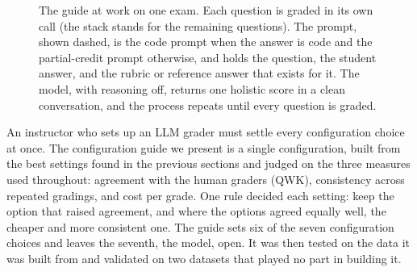 \begin{figure}[!tb]
{%
}
\caption{The guide at work on one exam. Each question is graded in its own call (the stack stands for the
remaining questions). The prompt, shown dashed, is the code prompt when the answer is code and the
partial-credit prompt otherwise, and holds the question, the student answer, and the rubric or reference answer
that exists for it. The
model, with reasoning off, returns one holistic score in a clean conversation, and the process repeats until every
question is graded.}
\label{fig:frameworkdiagram}
\end{figure}





An instructor who sets up an LLM grader must settle every configuration choice at once. The configuration guide
we present is a single configuration, built from the best settings found in the previous sections and
judged on the three measures used throughout: agreement with the human graders
(QWK), consistency across repeated gradings, and cost per grade. One rule decided each setting: keep the option
that raised agreement, and where the options agreed equally well, the cheaper and more consistent one. The guide sets six of
the seven configuration choices and leaves the seventh, the model, open. It was then tested on the data it was built from and validated on two datasets that
played no part in building it.


